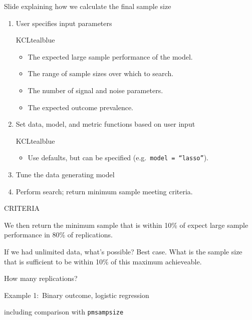 \documentclass[11pt]{beamer}
\newcommand{\sgap}{\vspace{0.5em}}
\begin{document}
\begin{frame}[t]{Slide explaining how we calculate the final sample size}
	\begin{enumerate}
		\item User specifies input parameters
		      \begin{cbox}{KCLtealblue}{}
			      \begin{itemize}
				      \item The expected large sample performance of the
				            model.
				      \item The range of sample sizes over which to search.
				      \item The number of signal and noise parameters.
				      \item The expected outcome prevalence.
			      \end{itemize}
		      \end{cbox}
		\item Set data, model, and metric functions based on user input
		      \begin{cbox}{KCLtealblue}{}
			      \begin{itemize}
				      \item Use defaults, but can be specified (e.g.\
				            \texttt{model = ``lasso''}).
			      \end{itemize}
		      \end{cbox}

		\item Tune the data generating model
		\item Perform search; return minimum sample meeting criteria.
	\end{enumerate}

	\sgap

\end{frame}

\begin{frame}[t]{CRITERIA}

	We then return the minimum sample that is within 10\% of expect large
	sample performance in 80\% of replications.

	If we had unlimited data, what's possible? Best case. What is the sample
	size that is sufficient to be within 10\% of this maximum achieveable.

	How many replications?

\end{frame}

\begin{frame}[t]{Example 1:\ Binary outcome, logistic regression }

	including comparison with \texttt{pmsampsize}

\end{frame}
\end{document}
